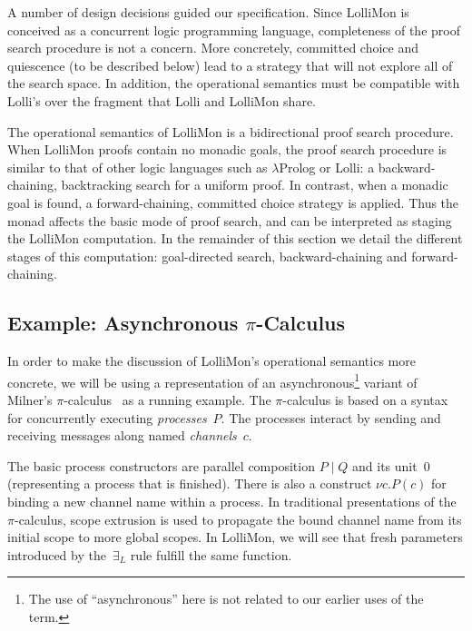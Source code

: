 \documentclass{sig-alt}
\begin{document}
A number of design decisions guided our specification.  Since LolliMon
is conceived as a concurrent logic programming language, completeness
of the proof search procedure is not a concern.  More concretely,
committed choice and quiescence (to be described below) lead to a
strategy that will not explore all of the search space.  In addition,
the operational semantics must be compatible with Lolli's over the fragment
that Lolli and LolliMon share.

The operational semantics of LolliMon is a bidirectional proof search
procedure.  When LolliMon proofs contain no monadic goals, the proof
search procedure is similar to that of other logic languages such as
$\lambda$Prolog or Lolli: a backward-chaining, backtracking
search for a uniform proof.  In contrast, when a monadic
goal is found, a forward-chaining, committed choice strategy is
applied.  Thus the monad affects the basic mode of proof search, and
can be interpreted as staging the LolliMon computation.  In the
remainder of this section we detail the different stages of this
computation: goal-directed search, backward-chaining and
forward-chaining.

\subsection{Example: Asynchronous $\pi$-Calculus}

In order to make the discussion of LolliMon's operational semantics
more concrete, we will be using a representation of an
asynchronous\footnote{The use of ``asynchronous'' here is not related
to our earlier uses of the term.}  variant of Milner's
$\pi$-calculus~\cite{Milner99} as a running example. The $\pi$-calculus is
based on a syntax for concurrently executing \emph{processes}~$P$. The
processes interact by sending and receiving messages along named
\emph{channels}~$c$.

The basic process constructors are parallel composition $P\mid Q$ and
its unit~$0$ (representing a process that
is finished).  There is also a construct $\nu c. P(c)$ for binding a
new channel name within a process.  In traditional presentations
of the $\pi$-calculus, scope extrusion is used to propagate the bound
channel name from its initial scope to more global scopes.  In LolliMon,
we will see that fresh parameters introduced by the~$\exists_L$ rule
fulfill the same function.

\def\pin#1#2{#1(#2)}
\def\pout#1#2{\bar{#1}\langle#2\rangle}
\def\prin#1#2{!#1(#2)}
\end{document}
